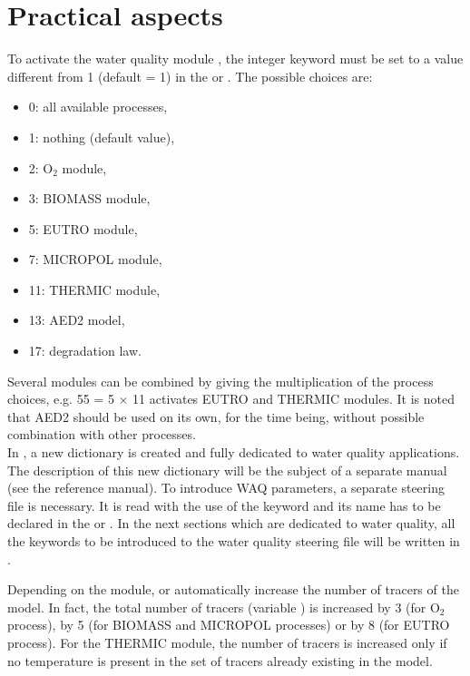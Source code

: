 \chapter{Practical aspects}

To activate the water quality module \waqtel, the integer keyword
 must be set to a value different from 1 (default = 1)
in the  or  .
The possible choices are:
\begin{itemize}
\item 0: all available processes,
\item 1: nothing (default value),
\item 2: O$_2$ module,
\item 3: BIOMASS module,
\item 5: EUTRO module,
\item 7: MICROPOL module,
\item 11: THERMIC module,
\item 13: AED2 model,
\item 17: degradation law.
\end{itemize}

Several modules can be combined by giving the multiplication of the process choices,
e.g. 55 = 5 $\times$ 11 activates EUTRO and THERMIC modules.
It is noted that AED2 should be used on its own, for the time being,
without possible combination with other processes.\\

In \waqtel, a new dictionary is created and fully dedicated to water quality applications.
The description of this new dictionary will be the subject of a separate manual
(see the \waqtel reference manual).
To introduce WAQ parameters, a separate steering file is necessary.
It is read with the use of the keyword 
and its name has to be declared in the  or 
.
In the next sections which are dedicated to water quality,
all the keywords to be introduced to the water quality steering file
will be written in .

Depending on the \waqtel module,  or 
automatically increase the number of tracers of the model.
In fact, the total number of tracers (variable )
is increased by 3 (for O$_2$ process), by 5 (for BIOMASS and MICROPOL processes)
or by 8 (for EUTRO process).
For the THERMIC module, the number of tracers is increased only
if no temperature is present in the set of tracers already existing in the model.

